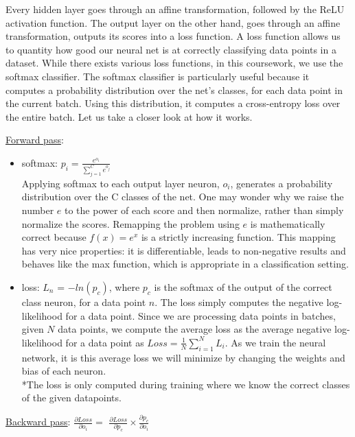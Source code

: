 
Every hidden layer goes through an affine transformation, followed by the ReLU activation function.
The output layer on the other hand,  goes through an affine transformation, outputs its scores into a loss function.
A loss function allows us to quantity how good our neural net is at correctly classifying data points in a dataset.
While there exists various loss functions, in this coursework, we use the softmax classifier.
The softmax classifier is particularly useful because it computes a probability distribution over the net's classes, for each data point in the current batch.
Using this distribution, it computes a cross-entropy loss over the entire batch.
Let us take a closer look at how it works.

\underline{Forward pass}:

\begin{itemize}[topsep=-10pt]
   \item softmax: $p_i = \frac{e^{o_i}}{\sum_{j=1}^{C} e^{o_j}}$\\
     Applying softmax to each output layer neuron, $o_i$, generates a probability distribution over the C classes of the net.
     One may wonder why we raise the number $e$ to the power of each score and then normalize,
     rather than simply normalize the scores. Remapping the problem using $e$ is mathematically correct because
     $f(x) = e^x$ is a strictly increasing function.
     This mapping has very nice properties: it is differentiable, leads to non-negative results and behaves like the max function,
     which is appropriate in a classification setting.
     
   \item loss: $L_n$ = $-ln(p_c)$, where $p_c$ is the softmax of the output of the correct class neuron, for a data point $n$.
     The loss simply computes the negative log-likelihood for a data point.
     Since we are processing data points in batches, given $N$ data points,
     we compute the average loss as the average negative log-likelihood for a data point as $Loss = \frac{1}{N}\sum_{i=1}^{N}L_i$.
     As we train the neural network, it is this average loss we will minimize by changing the weights and bias of each neuron.\\
     *The loss is only computed during training where we know the correct classes of the given datapoints.\\
          
\end{itemize}


\underline{Backward pass}: $\frac{\partial Loss}{\partial o_i} = $
$\frac{\partial Loss}{\partial p_c} \times \frac{\partial p_c}{\partial o_i}$


